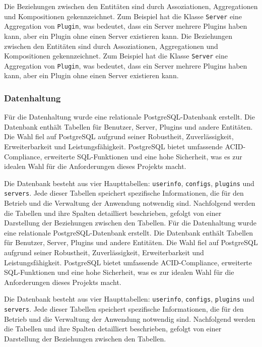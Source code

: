 Die Beziehungen zwischen den Entitäten sind durch Assoziationen, Aggregationen und Kompositionen gekennzeichnet. Zum Beispiel hat die Klasse \texttt{Server} eine Aggregation von \texttt{Plugin}, was bedeutet, dass ein Server mehrere Plugins haben kann, aber ein Plugin ohne einen Server existieren kann.
Die Beziehungen zwischen den Entitäten sind durch Assoziationen, Aggregationen und Kompositionen gekennzeichnet. Zum Beispiel hat die Klasse \texttt{Server} eine Aggregation von \texttt{Plugin}, was bedeutet, dass ein Server mehrere Plugins haben kann, aber ein Plugin ohne einen Server existieren kann.

\subsubsection{Datenhaltung}\label{datenhaltung}

Für die Datenhaltung wurde eine relationale PostgreSQL-Datenbank erstellt. Die Datenbank enthält Tabellen für Benutzer, Server, Plugins und andere Entitäten. Die Wahl fiel auf PostgreSQL aufgrund seiner Robustheit, Zuverlässigkeit, Erweiterbarkeit und Leistungsfähigkeit. PostgreSQL bietet umfassende ACID-Compliance, erweiterte SQL-Funktionen und eine hohe Sicherheit, was es zur idealen Wahl für die Anforderungen dieses Projekts macht.

Die Datenbank besteht aus vier Haupttabellen: \texttt{userinfo}, \texttt{configs}, \texttt{plugins} und \texttt{servers}. Jede dieser Tabellen speichert spezifische Informationen, die für den Betrieb und die Verwaltung der Anwendung notwendig sind. Nachfolgend werden die Tabellen und ihre Spalten detailliert beschrieben, gefolgt von einer Darstellung der Beziehungen zwischen den Tabellen.
Für die Datenhaltung wurde eine relationale PostgreSQL-Datenbank erstellt. Die Datenbank enthält Tabellen für Benutzer, Server, Plugins und andere Entitäten. Die Wahl fiel auf PostgreSQL aufgrund seiner Robustheit, Zuverlässigkeit, Erweiterbarkeit und Leistungsfähigkeit. PostgreSQL bietet umfassende ACID-Compliance, erweiterte SQL-Funktionen und eine hohe Sicherheit, was es zur idealen Wahl für die Anforderungen dieses Projekts macht.

Die Datenbank besteht aus vier Haupttabellen: \texttt{userinfo}, \texttt{configs}, \texttt{plugins} und \texttt{servers}. Jede dieser Tabellen speichert spezifische Informationen, die für den Betrieb und die Verwaltung der Anwendung notwendig sind. Nachfolgend werden die Tabellen und ihre Spalten detailliert beschrieben, gefolgt von einer Darstellung der Beziehungen zwischen den Tabellen.

